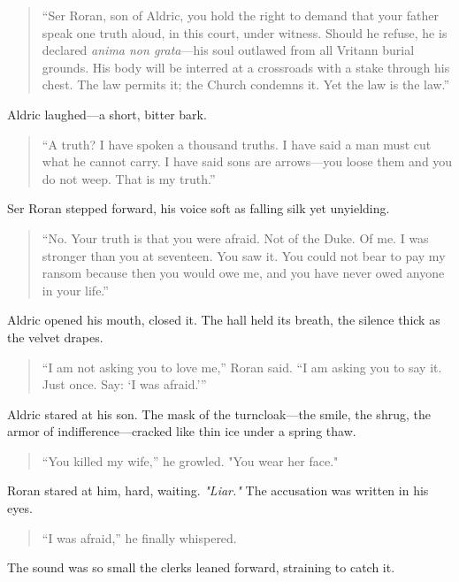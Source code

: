 \documentclass[11pt]{book}
\begin{document}
\begin{quote}
``Ser Roran, son of Aldric, you hold the right to demand that your father speak one truth aloud, in this court, under witness. Should he refuse, he is declared \textit{anima non grata}—his soul outlawed from all Vritann burial grounds. His body will be interred at a crossroads with a stake through his chest. The law permits it; the Church condemns it. Yet the law is the law.''
\end{quote}

Aldric laughed—a short, bitter bark.

\begin{quote}
``A truth? I have spoken a thousand truths. I have said a man must cut what he cannot carry. I have said sons are arrows—you loose them and you do not weep. That is my truth.''
\end{quote}

Ser Roran stepped forward, his voice soft as falling silk yet unyielding.

\begin{quote}
``No. Your truth is that you were afraid. Not of the Duke. Of me. I was stronger than you at seventeen. You saw it. You could not bear to pay my ransom because then you would owe me, and you have never owed anyone in your life.''
\end{quote}

Aldric opened his mouth, closed it. The hall held its breath, the silence thick as the velvet drapes.

\begin{quote}
``I am not asking you to love me,'' Roran said. ``I am asking you to say it. Just once. Say: ‘I was afraid.’''
\end{quote}

Aldric stared at his son. The mask of the turncloak—the smile, the shrug, the armor of indifference—cracked like thin ice under a spring thaw.

\begin{quote}
``You killed my wife,'' he growled. "You wear her face."
\end{quote}

Roran stared at him, hard, waiting. \textit{"Liar."} The accusation was written in his eyes.

\begin{quote}
    ``I was afraid,'' he finally whispered.
\end{quote}

The sound was so small the clerks leaned forward, straining to catch it.
\end{document}

